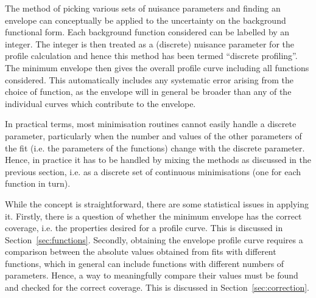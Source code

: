 The method of picking various sets of nuisance parameters and finding
an envelope can conceptually be applied to the uncertainty on the background functional form.
Each background function considered can be labelled by an
integer. The integer is then treated as a (discrete) nuisance parameter
for the profile calculation and hence this method has been termed
``discrete profiling''.
The minimum envelope then gives the overall profile curve including
all functions considered. This automatically includes any systematic error
arising from the choice of function, as the envelope will in general be broader
than any of the individual curves which contribute to the envelope.

In practical terms, most minimisation routines
cannot easily handle a discrete parameter, particularly when the
number and values of the other parameters of the fit (i.e. the parameters
of the functions) change with the discrete parameter.
Hence, in practice it has
to be handled by mixing the methods as discussed in the previous section,
i.e. as a discrete set of continuous minimisations (one for each function in turn).

While the concept is straightforward, there are some statistical
issues in applying it.
Firstly, there is a question of whether the \nll minimum envelope has the correct coverage,
i.e. the properties desired for a profile curve.
This is discussed in Section~\ref{sec:functions}.
Secondly, obtaining the envelope profile curve requires a
comparison between the absolute \nll values obtained from fits with different functions, which
in general can include functions with different numbers of parameters.
Hence, a way to meaningfully compare their \nll values must be found and checked for the correct coverage.
This is discussed in Section~\ref{sec:correction}.
